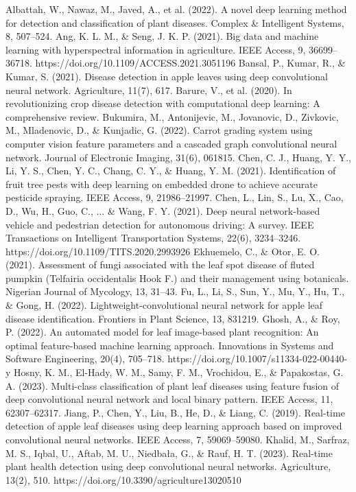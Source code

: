 	Albattah, W., Nawaz, M., Javed, A., et al. (2022). A novel deep learning method for detection
	and classification of plant diseases. Complex \& Intelligent Systems, 8, 507–524.
	Ang, K. L. M., \& Seng, J. K. P. (2021). Big data and machine learning with hyperspectral information in agriculture. IEEE Access, 9, 36699–36718. https://doi.org/10.1109/ACCESS.2021.3051196
	Bansal, P., Kumar, R., \& Kumar, S. (2021). Disease detection in apple leaves using deep convolutional neural network. Agriculture, 11(7), 617.
	Barure, V., et al. (2020). In revolutionizing crop disease detection with computational deep learning: A comprehensive review.
	Bukumira, M., Antonijevic, M., Jovanovic, D., Zivkovic, M., Mladenovic, D., \& Kunjadic, G. (2022). Carrot grading system using computer vision feature parameters and a cascaded graph convolutional neural network. Journal of Electronic Imaging, 31(6), 061815.
	Chen, C. J., Huang, Y. Y., Li, Y. S., Chen, Y. C., Chang, C. Y., \& Huang, Y. M. (2021). Identification of fruit tree pests with deep learning on embedded drone to achieve accurate pesticide spraying. IEEE Access, 9, 21986–21997.
	Chen, L., Lin, S., Lu, X., Cao, D., Wu, H., Guo, C., ... \& Wang, F. Y. (2021). Deep neural network-based vehicle and pedestrian detection for autonomous driving: A survey. IEEE Transactions on Intelligent Transportation Systems, 22(6), 3234–3246. https://doi.org/10.1109/TITS.2020.2993926
	Ekhuemelo, C., \& Otor, E. O. (2021). Assessment of fungi associated with the leaf spot disease of fluted pumpkin (Telfairia occidentalis Hook F.) and their management using botanicals. Nigerian Journal of Mycology, 13, 31–43.
	Fu, L., Li, S., Sun, Y., Mu, Y., Hu, T., \& Gong, H. (2022). Lightweight-convolutional neural network for apple leaf disease identification. Frontiers in Plant Science, 13, 831219.
	Ghosh, A., \& Roy, P. (2022). An automated model for leaf image-based plant recognition: An optimal feature-based machine learning approach. Innovations in Systems and Software Engineering, 20(4), 705–718. https://doi.org/10.1007/s11334-022-00440-y
	Hosny, K. M., El-Hady, W. M., Samy, F. M., Vrochidou, E., \& Papakostas, G. A. (2023). Multi-class classification of plant leaf diseases using feature fusion of deep convolutional neural network and local binary pattern. IEEE Access, 11, 62307–62317.
	Jiang, P., Chen, Y., Liu, B., He, D., \& Liang, C. (2019). Real-time detection of apple leaf diseases using deep learning approach based on improved convolutional neural networks. IEEE Access, 7, 59069–59080.
	Khalid, M., Sarfraz, M. S., Iqbal, U., Aftab, M. U., Niedbała, G., \& Rauf, H. T. (2023). Real-time plant health detection using deep convolutional neural networks. Agriculture, 13(2), 510. https://doi.org/10.3390/agriculture13020510
